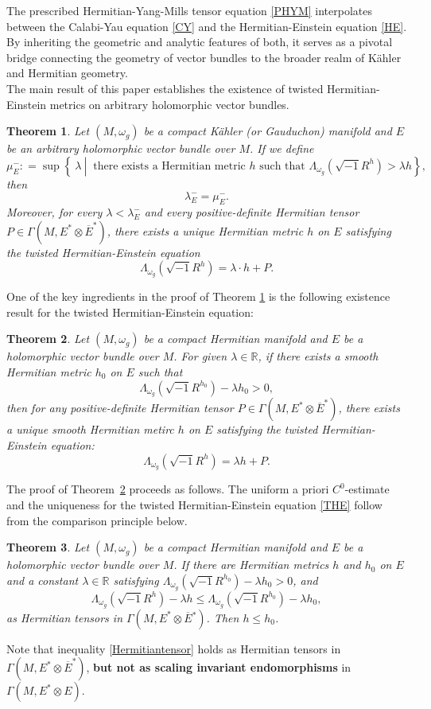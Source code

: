 \documentclass[12pt, reqno]{amsart}
\theoremstyle{plain}
\newtheorem{thm}{Theorem}[section]
\theoremstyle{definition}
\newcommand{\btheorem}{\begin{thm}}
\newcommand{\etheorem}{\end{thm}}
\newcommand{\sq}{\sqrt{-1}}
\renewcommand{\bar}{\overline}
\newcommand{\beq}{\begin{equation}}
\newcommand{\eeq}{\end{equation}}
\newcommand{\ts}{\otimes}
\renewcommand{\>}{\rightarrow}
\newcommand{\R}{{\mathbb R}}
\renewcommand{\>}{\rightarrow}
\renewcommand{\bar}{\overline}
\numberwithin{equation}{section} %
\begin{document}
The prescribed Hermitian-Yang-Mills tensor equation \eqref{PHYM} interpolates between the Calabi-Yau equation \eqref{CY} and the Hermitian-Einstein equation \eqref{HE}. By inheriting the geometric and analytic features of both, it serves as a pivotal bridge connecting the geometry of vector bundles to the broader realm of K\"ahler and Hermitian geometry.\\

    The main result of this paper establishes  the existence of twisted Hermitian-Einstein metrics on  arbitrary  holomorphic vector bundles.

    \btheorem
    \label{main}
    Let $ (M,\omega_g) $ be a compact K\"ahler (or Gauduchon) manifold and $ E $ be an arbitrary holomorphic vector bundle over $ M $.  If we define 
     \beq \mu_E^-: = \sup
    \left\{\ \lambda\ \left|\  \text{ there exists a Hermitian metric }
    h \text{ such that } \Lambda_{\omega_g}\left(\sq R^h\right) >
    \lambda h \right.\right\}, \label{mu} \eeq
     then \beq \lambda_E^-=\mu_E^-.\eeq  Moreover,   for every $\lambda<\lambda_E^-$ and every positive-definite Hermitian tensor $P\in \Gamma(M,E^*\ts \bar E^* )$, there exists a unique Hermitian metric $h$ on $E$ satisfying the twisted Hermitian-Einstein equation
    \beq \Lambda_{\omega_g}\left(\sq R^h\right)=\lambda\cdot h+ P.\label{tHE}\eeq
    \etheorem
    \noindent 

\noindent
    One of the key ingredients in the proof of Theorem \ref{main} is the following existence result for the twisted Hermitian-Einstein equation:

\btheorem
\label{main2}
Let $ (M,\omega_g) $ be a compact Hermitian manifold and $ E $ be a holomorphic vector bundle over $ M $. For given $ \lambda \in \mathbb{R} $, if there exists a smooth Hermitian metric $ h_0 $ on $ E $ such that
\beq \Lambda_{\omega_g}\left(\sq R^{h_0}\right) - \lambda h_0  > 0, \label{curvaturecondition} \eeq
then for any positive-definite Hermitian tensor $ P \in \Gamma(M,E^*\ts \bar E^*) $, there exists a unique smooth Hermitian metirc $ h $ on $ E $ satisfying the twisted Hermitian-Einstein equation:
\beq \Lambda_{\omega_g}\left(\sq R^h\right)=\lambda h+ P.\label{THE} \eeq
\etheorem

\noindent The proof of Theorem~\ref{main2} proceeds as follows. The uniform a priori  $C^0$-estimate and the uniqueness for the twisted Hermitian-Einstein equation \eqref{THE} follow from the comparison principle below.
\btheorem\label{main5} Let $ (M,\omega_g)
$ be a compact Hermitian manifold and $ E $ be a holomorphic vector
bundle over $ M $. If there are  Hermitian metrics $ h$ and  $h_0 $
on $E$ and a constant $\lambda\in \R$ satisfying
$\Lambda_{\omega_g}\left(\sq R^{h_0}\right)-\lambda h_0>0$, and
\beq  \Lambda_{\omega_g}\left(\sq R^{h}\right) -
\lambda h \leq \Lambda_{\omega_g}\left(\sq R^{h_0}\right) - \lambda
h_0, \label{Hermitiantensor} \eeq as Hermitian tensors in $ \Gamma(M,E^*\otimes \bar E{}^*)
$. Then $ h \leq h_0 $. \etheorem
\noindent 
Note that inequality \eqref{Hermitiantensor} holds as Hermitian tensors in $\Gamma(M,E^*\otimes  \bar E^*)$,  \textbf{but not  as scaling invariant endomorphisms} in  $\Gamma(M,E^*\otimes E)$.\\
\end{document}
